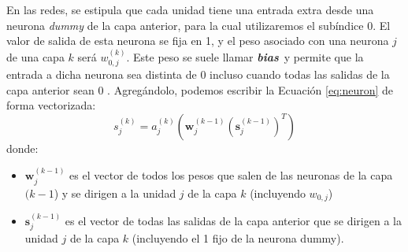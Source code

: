 \documentclass[../../main.tex]{subfiles}
\begin{document}
En las redes, se estipula que cada unidad tiene una entrada extra desde una neurona
\textit{dummy} de la capa anterior, para la cual utilizaremos el subíndice 0. El valor de
salida de esta neurona se fija en 1, y el peso asociado con una neurona \(j\) de una capa
\(k\) será \(w^{(k)}_{0,j}\). Este peso se suele llamar
\textit{\textbf{bias}}\footnotemark\ y permite que la entrada a dicha neurona sea distinta
de 0 incluso cuando todas las salidas de la capa anterior sean 0
\cite{ai-a-modern-approach}. Agregándolo, podemos escribir la Ecuación \ref{eq:neuron} de
forma vectorizada:
\begin{equation}
    s^{(k)}_j = a^{(k)}_j \left( \bm{w}^{(k-1)}_j \left( \bm{s}^{(k-1)}_j \right)^T \right)
\end{equation}
donde: \vspace{-0.25cm}
\begin{itemize}
    \item \(\bm{w}^{(k-1)}_j\) es el vector de todos los pesos que salen de las neuronas de la
    capa \((k-1\)) y se dirigen a la unidad \(j\) de la capa \(k\) (incluyendo \(w_{0,j}\))
    \item \(\bm{s}^{(k-1)}_j\) es el vector de todas las salidas de la capa anterior que se
dirigen a la unidad \(j\) de la capa \(k\) (incluyendo el 1 fijo de la neurona dummy).
\end{itemize}
\end{document}
